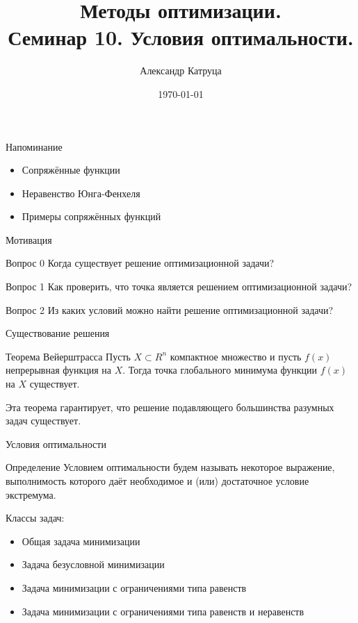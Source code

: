 \documentclass[12pt]{beamer}
\title[Семинар 10]{Методы оптимизации. \\
 Семинар 10. Условия оптимальности.}
\author{Александр Катруца}
\institute{Московский физико-технический институт\\
Факультет Управления и Прикладной Математики}
\date{\today}
\begin{document}
\begin{frame}
\maketitle
\end{frame}

\begin{frame}{Напоминание}
\begin{itemize}
\item Сопряжённые функции
\item Неравенство Юнга-Фенхеля
\item Примеры сопряжённых функций
\end{itemize}
\end{frame}

\begin{frame}{Мотивация}

\begin{block}{Вопрос 0}
Когда существует решение оптимизационной задачи?
\end{block}

\begin{block}{Вопрос 1}
Как проверить, что точка является решением оптимизационной задачи? 
\end{block}

\begin{block}{Вопрос 2}
Из каких условий можно найти решение оптимизационной задачи?
\end{block}

\end{frame}

\begin{frame}{Существование решения}
\begin{block}{Теорема Вейерштрасса}
Пусть $X \subset R^n$ компактное множество и пусть $f(x)$ непрерывная функция на $X$. 
Тогда точка глобального минимума функции $f (x)$ на $X$ существует.
\end{block}

Эта теорема гарантирует, что решение подавляющего большинства разумных задач существует.
 
\end{frame}

\begin{frame}{Условия оптимальности}
\begin{block}{Определение}
Условием оптимальности будем называть некоторое выражение, выполнимость которого даёт необходимое и (или) достаточное условие экстремума. 
\end{block}
Классы задач:
\begin{itemize}
\item Общая задача минимизации
\item Задача безусловной минимизации
\item Задача минимизации с ограничениями типа равенств
\item Задача минимизации с ограничениями типа равенств и неравенств
\end{itemize}
\end{frame}
\end{document}
